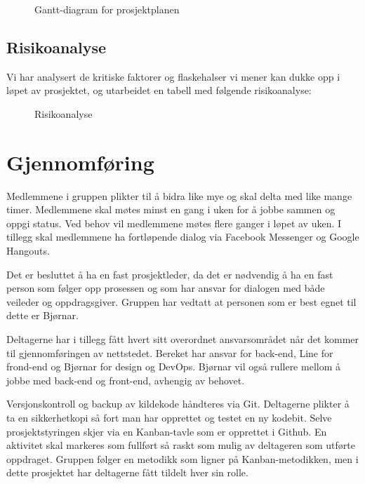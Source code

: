 \begin{figure}[H]
    \centering
    \caption{Gantt-diagram for prosjektplanen}
    \label{fig:gantt-diagram}
\end{figure}

\smallskip

\subsection*{Risikoanalyse}

Vi har analysert de kritiske faktorer og flaskehalser vi mener kan dukke opp i løpet av prosjektet, og utarbeidet en tabell med følgende risikoanalyse:

\begin{figure}[H]
    \centering
    \caption{Risikoanalyse}
    \label{fig:risikoanalyse}
\end{figure}

\section*{Gjennomføring}
Medlemmene i gruppen plikter til å bidra like mye og skal delta med like mange timer. Medlemmene skal møtes minst en gang i uken for å jobbe sammen og oppgi status. Ved behov vil medlemmene møtes flere ganger i løpet av uken. I tillegg skal medlemmene ha fortløpende dialog via Facebook Messenger og Google Hangouts.


Det er besluttet å ha en fast prosjektleder, da det er nødvendig å ha en fast person som følger opp prosessen og som har ansvar for dialogen med både veileder og oppdragsgiver. Gruppen har vedtatt at personen som er best egnet til dette er Bjørnar.

Deltagerne har i tillegg fått hvert sitt overordnet ansvarsområdet når det kommer til gjennomføringen av nettstedet. Bereket har ansvar for back-end, Line for frond-end og Bjørnar for design og DevOps. Bjørnar vil også rullere mellom å jobbe med back-end og front-end, avhengig av behovet.

Versjonskontroll og backup av kildekode håndteres via Git. Deltagerne plikter å ta en sikkerhetkopi så fort man har opprettet og testet en ny kodebit. Selve prosjektstyringen skjer via en Kanban-tavle som er opprettet i Github. En aktivitet skal markeres som fullført så raskt som mulig av deltageren som utførte oppdraget. Gruppen følger en metodikk som ligner på Kanban-metodikken, men i dette prosjektet har deltagerne fått tildelt hver sin rolle. 

